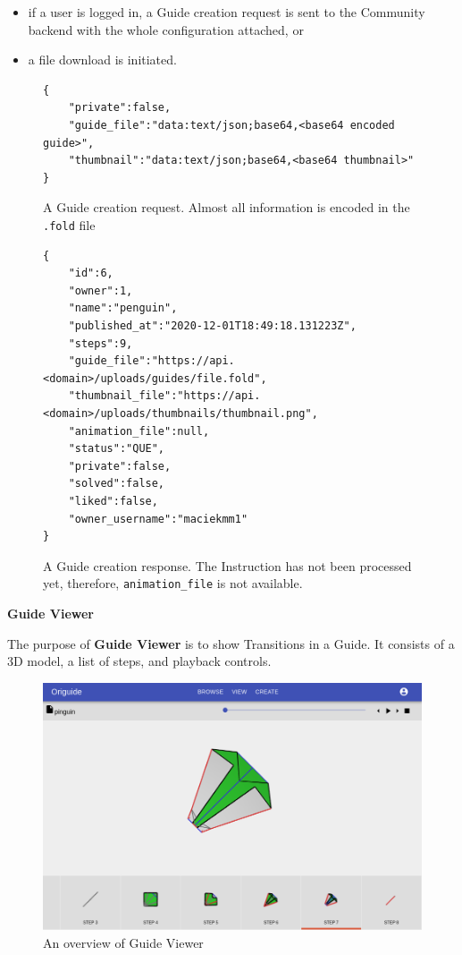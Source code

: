 \begin{itemize}
	\item if a user is logged in, a Guide creation request is sent to the Community backend with the whole configuration attached, or
	\item a file download is initiated.
\end{itemize}

\begin{figure}[H]
	\caption{A Guide creation request. Almost all information is encoded in the \texttt{.fold} file}
	\begin{lstlisting}
{
	"private":false,
	"guide_file":"data:text/json;base64,<base64 encoded guide>",
	"thumbnail":"data:text/json;base64,<base64 thumbnail>"
}
	\end{lstlisting}
\end{figure}

\begin{figure}[H]
	\caption{A Guide creation response. The Instruction has not been processed yet, therefore, \texttt{animation\_file} is not available.}
	\label{guide-response}
	\begin{lstlisting}
{
	"id":6,
	"owner":1,
	"name":"penguin",
	"published_at":"2020-12-01T18:49:18.131223Z",
	"steps":9,
	"guide_file":"https://api.<domain>/uploads/guides/file.fold",
	"thumbnail_file":"https://api.<domain>/uploads/thumbnails/thumbnail.png",
	"animation_file":null,
	"status":"QUE",
	"private":false,
	"solved":false,
	"liked":false,
	"owner_username":"maciekmm1"
}
	\end{lstlisting}
\end{figure}


\textbf{Guide Viewer}

The purpose of \textbf{Guide Viewer} is to show Transitions in a Guide. It consists of a 3D model, a list of steps, and playback controls.

\begin{figure}[h]
  \caption{An overview of Guide Viewer}
  \label{3-guide-viewer}
  \centering
    \includegraphics[width=\textwidth]{assets/3-guide-viewer.png}
\end{figure}

